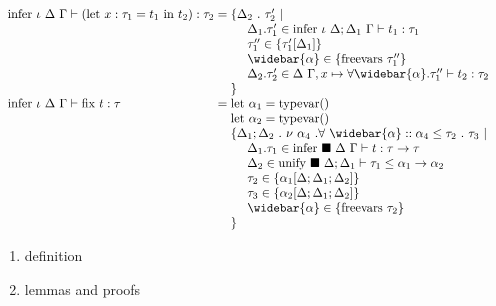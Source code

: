 \documentclass[manuscript]{acmart}
\begin{document}
\[\begin{array}{l @{} l}
    \text{infer } \iota\ \Delta\ \Gamma \vdash 
    (\text{let}\ x : \tau_1 = t_1 \text{ in } t_2) : \tau_2
    &{} =
    \begin{array}[t]{@{} l}
      \{ \Delta_2\ .\ \tau_2' \ |\ 
      \\
      \ \ \ \ \Delta_1.\tau_1' \in \text{infer } \iota\ \Delta;\Delta_1\ \Gamma \vdash t_1 : \tau_1
      \\ 
      \ \ \ \ \tau_1'' \in \{\tau_1'[\Delta_1]\}
      \\ 
      \ \ \ \ \widebar{\alpha} \in \{\text{freevars}\ \tau_1''\}
      \\ 
      \ \ \ \ \Delta_2.\tau_2' \in \Delta\ \Gamma,x \mapsto \forall \widebar{\alpha} . \tau_1''
        \vdash t_2 : \tau_2 
      \\
      \} 
    \end{array}
    \\

    \text{infer } \iota\ \Delta\ \Gamma \vdash 
    \text{fix } t : \tau      
    &{} =
    \begin{array}[t]{@{} l}
      \text{let } \alpha_1 = \text{typevar}()
      \\
      \text{let } \alpha_2 = \text{typevar}()
      \\
      \{ \Delta_1;\Delta_2\ .\ \nu\ \alpha_4 \ . \forall\ \widebar{\alpha} ::
        \alpha_4 \leq \tau_2\ .\ \tau_3
        \ |\ 
      \\
      \ \ \ \ \Delta_1.\tau_1 \in
      \text{infer } \blacksquare\ \Delta\ \Gamma \vdash t : \tau \rightarrow \tau
      \\
      \ \ \ \ \Delta_2 \in \text{unify } \blacksquare\ \Delta;\Delta_1 \vdash 
      \tau_1 \leq \alpha_1 \rightarrow \alpha_2 
      \\
      \ \ \ \ \tau_2 \in \{\alpha_1[\Delta;\Delta_1;\Delta_2]\}
      \\ 
      \ \ \ \ \tau_3 \in \{\alpha_2[\Delta;\Delta_1;\Delta_2]\} 
      \\
      \ \ \ \ \widebar{\alpha} \in \{ \text{freevars}\ \tau_2 \}
      \\
      \} 
    \end{array}
  \end{array}
\]


\begin{enumerate}
  \item definition 
  \item lemmas and proofs 
\end{enumerate}
\end{document}
